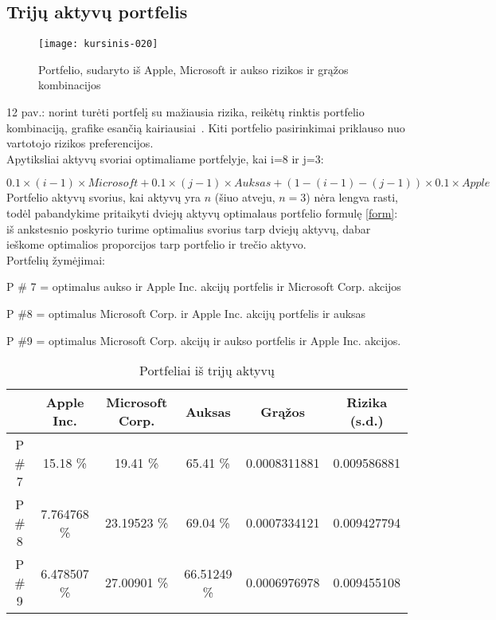 \documentclass[12pt, a14paper, lithuanian]{article}
\begin{document}
           
\subsection{Trijų aktyvų portfelis}
 
\begin{figure}[H]
  \centering
\texttt{[image: kursinis-020]}
  \caption{Portfelio, sudaryto iš Apple, Microsoft ir aukso rizikos ir grąžos kombinacijos}
\end{figure}

12 pav.: norint turėti portfelį su mažiausia rizika, reikėtų rinktis portfelio kombinaciją, grafike esančią kairiausiai~\cite{cope}. Kiti portfelio pasirinkimai priklauso nuo vartotojo rizikos preferencijos. \\

Apytiksliai aktyvų svoriai optimaliame portfelyje, kai i=8 ir j=3:

$ 0.1 \times (i-1) \times Microsoft + 0.1 \times (j-1) \times Auksas + (1 - (i-1) - (j-1)) \times  0.1 \times Apple$ \\



Portfelio aktyvų svorius, kai aktyvų yra $n$ (šiuo atveju, $n=3$) nėra lengva rasti, todėl pabandykime pritaikyti dviejų aktyvų optimalaus portfelio formulę \eqref{form}: iš ankstesnio poskyrio turime optimalius svorius tarp dviejų aktyvų, dabar ieškome optimalios proporcijos tarp portfelio ir trečio aktyvo. \\


Portfelių žymėjimai:

P \# 7 = optimalus aukso ir Apple Inc. akcijų portfelis ir Microsoft Corp. akcijos

P \#8 = optimalus Microsoft Corp. ir Apple Inc. akcijų portfelis ir auksas

P \#9 = optimalus Microsoft Corp. akcijų ir aukso portfelis ir Apple Inc. akcijos.

\begin{table}[ht]
\begin{center}
\begin{tabular}{cccccc}
  \hline
  & Apple Inc. & Microsoft Corp. & Auksas & Grąžos & Rizika (s.d.) \\ 
  \hline
P \# 7 & 15.18 \% & 19.41 \% & 65.41 \% & 0.0008311881 & 0.009586881 &\\
\hline
 P \# 8 & 7.764768 \% & 23.19523 \% & 69.04 \% & 0.0007334121 & 0.009427794 &\\ 
\hline
P \# 9 & 6.478507 \% & 27.00901 \% & 66.51249 \% & 0.0006976978 & 0.009455108 &\\
\hline

\end{tabular}
\end{center}
\caption{Portfeliai iš trijų aktyvų}
\end{table}
\end{document}
